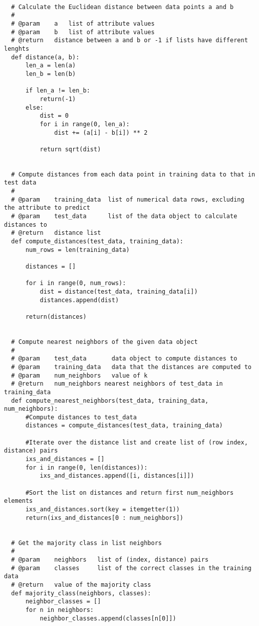 \documentclass[a4paper]{article}
\begin{document}
  \begin{lstlisting}

  # Calculate the Euclidean distance between data points a and b
  #
  # @param    a   list of attribute values
  # @param    b   list of attribute values
  # @return   distance between a and b or -1 if lists have different lenghts 
  def distance(a, b):
      len_a = len(a)
      len_b = len(b)

      if len_a != len_b:
          return(-1)
      else:
          dist = 0
          for i in range(0, len_a):
              dist += (a[i] - b[i]) ** 2

          return sqrt(dist)


  # Compute distances from each data point in training data to that in test data
  #
  # @param    training_data  list of numerical data rows, excluding the attribute to predict
  # @param    test_data      list of the data object to calculate distances to
  # @return   distance list
  def compute_distances(test_data, training_data):
      num_rows = len(training_data)

      distances = []

      for i in range(0, num_rows):
          dist = distance(test_data, training_data[i])
          distances.append(dist)

      return(distances)


  # Compute nearest neighbors of the given data object
  #
  # @param    test_data       data object to compute distances to
  # @param    training_data   data that the distances are computed to
  # @param    num_neighbors   value of k
  # @return   num_neighbors nearest neighbors of test_data in training_data
  def compute_nearest_neighbors(test_data, training_data, num_neighbors):
      #Compute distances to test_data
      distances = compute_distances(test_data, training_data)

      #Iterate over the distance list and create list of (row index, distance) pairs
      ixs_and_distances = []
      for i in range(0, len(distances)):
          ixs_and_distances.append([i, distances[i]])

      #Sort the list on distances and return first num_neighbors elements
      ixs_and_distances.sort(key = itemgetter(1))
      return(ixs_and_distances[0 : num_neighbors])


  # Get the majority class in list neighbors
  #
  # @param    neighbors   list of (index, distance) pairs
  # @param    classes     list of the correct classes in the training data
  # @return   value of the majority class 
  def majority_class(neighbors, classes):
      neighbor_classes = []
      for n in neighbors:
          neighbor_classes.append(classes[n[0]])


\end{lstlisting}
\end{document}
